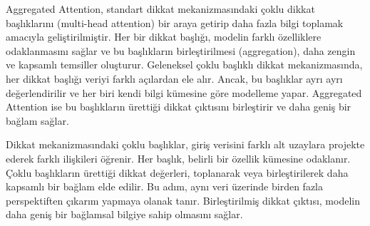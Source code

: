 Aggregated Attention, standart dikkat mekanizmasındaki çoklu dikkat başlıklarını (multi-head attention) bir araya getirip daha fazla bilgi toplamak amacıyla geliştirilmiştir. Her bir dikkat başlığı, modelin farklı özelliklere odaklanmasını sağlar ve bu başlıkların birleştirilmesi (aggregation), daha zengin ve kapsamlı temsiller oluşturur. Geleneksel çoklu başlıklı dikkat mekanizmasında, her dikkat başlığı veriyi farklı açılardan ele alır. Ancak, bu başlıklar ayrı ayrı değerlendirilir ve her biri kendi bilgi kümesine göre modelleme yapar. Aggregated Attention ise bu başlıkların ürettiği dikkat çıktısını birleştirir ve daha geniş bir bağlam sağlar.

Dikkat mekanizmasındaki çoklu başlıklar, giriş verisini farklı alt uzaylara projekte ederek farklı ilişkileri öğrenir. Her başlık, belirli bir özellik kümesine odaklanır. Çoklu başlıkların ürettiği dikkat değerleri, toplanarak veya birleştirilerek daha kapsamlı bir bağlam elde edilir. Bu adım, aynı veri üzerinde birden fazla perspektiften çıkarım yapmaya olanak tanır. Birleştirilmiş dikkat çıktısı, modelin daha geniş bir bağlamsal bilgiye sahip olmasını sağlar.

\newpage